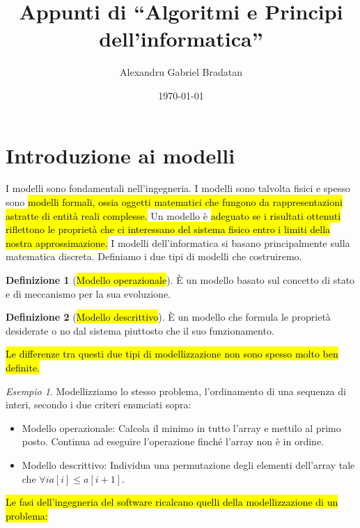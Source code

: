 \documentclass[a4paper,11pt,oneside]{article}
\title{Appunti di ``Algoritmi e Principi dell'informatica''}
\author{Alexandru Gabriel Bradatan}
\date{\today}
\theoremstyle{plain}
\theoremstyle{definition}
\newtheorem{defn}{Definizione}[section]
\theoremstyle{remark}
\newtheorem{esempio}{Esempio}[section]
\begin{document}
\maketitle
\tableofcontents
\newpage

\section{Introduzione ai modelli}\label{sec:modelli}

I modelli sono fondamentali nell'ingegneria. I modelli sono talvolta fisici e
spesso sono \hl{modelli formali, ossia oggetti matematici che fungono da
rappresentazioni astratte di entità reali complesse.} Un modello è \hl{adeguato
se i risultati ottenuti riflettono le proprietà che ci interessano del sistema
fisico entro i limiti della nostra approssimazione.} I modelli dell'informatica
si basano principalmente sulla matematica discreta. Definiamo i due tipi di
modelli che costruiremo.

\begin{defn}[\hl{Modello operazionale}]\label{def:modello-op}
  È un modello basato sul concetto di stato e di meccanismo per la sua
  evoluzione.
\end{defn}

\begin{defn}[\hl{Modello descrittivo}]\label{def:modello-desc}
  È un modello che formula le proprietà desiderate o no dal sistema piuttosto
  che il suo funzionamento.
\end{defn}

\hl{Le differenze tra questi due tipi di modellizzazione non sono spesso molto
ben definite.}

\begin{esempio}
  Modellizziamo lo stesso problema, l'ordinamento di una sequenza di interi,
  secondo i due criteri enunciati sopra:
  \begin{itemize}
    \item Modello operazionale: Calcola il minimo in tutto l'array e mettilo al
      primo posto. Continua ad eseguire l'operazione finché l'array non è in
      ordine.
    \item Modello descrittivo: Individua una permutazione degli elementi
      dell'array tale che \(\forall i a[i] \leq a[i+1]\).
  \end{itemize}
\end{esempio}

\hl{Le fasi dell'ingegneria del software ricalcano quelli della modellizzazione
di un problema:}
\end{document}
